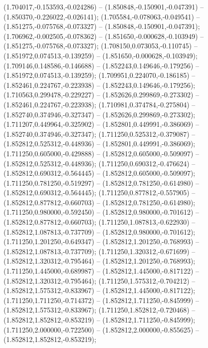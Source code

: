  (1.704017,-0.153593,-0.024286) -- (1.850848,-0.150901,-0.047391) -- (1.850370,-0.226022,-0.026141);
 (1.705584,-0.078063,-0.049541) -- (1.851275,-0.075768,-0.073327) -- (1.850848,-0.150901,-0.047391);
 (1.706962,-0.002505,-0.078362) -- (1.851650,-0.000628,-0.103949) -- (1.851275,-0.075768,-0.073327);
 (1.708150,0.073053,-0.110745) -- (1.851972,0.074513,-0.139259) -- (1.851650,-0.000628,-0.103949);
 (1.709146,0.148586,-0.146688) -- (1.852243,0.149646,-0.179256) -- (1.851972,0.074513,-0.139259);
 (1.709951,0.224070,-0.186185) -- (1.852461,0.224767,-0.223938) -- (1.852243,0.149646,-0.179256);
 (1.710563,0.299478,-0.229227) -- (1.852626,0.299869,-0.273302) -- (1.852461,0.224767,-0.223938);
 (1.710981,0.374784,-0.275804) -- (1.852740,0.374946,-0.327347) -- (1.852626,0.299869,-0.273302);
 (1.711207,0.449964,-0.325902) -- (1.852801,0.449991,-0.386069) -- (1.852740,0.374946,-0.327347);
 (1.711250,0.525312,-0.379087) -- (1.852812,0.525312,-0.448936) -- (1.852801,0.449991,-0.386069);
 (1.711250,0.605000,-0.429888) -- (1.852812,0.605000,-0.509097) -- (1.852812,0.525312,-0.448936);
 (1.711250,0.690312,-0.476624) -- (1.852812,0.690312,-0.564445) -- (1.852812,0.605000,-0.509097);
 (1.711250,0.781250,-0.519297) -- (1.852812,0.781250,-0.614980) -- (1.852812,0.690312,-0.564445);
 (1.711250,0.877812,-0.557905) -- (1.852812,0.877812,-0.660703) -- (1.852812,0.781250,-0.614980);
 (1.711250,0.980000,-0.592450) -- (1.852812,0.980000,-0.701612) -- (1.852812,0.877812,-0.660703);
 (1.711250,1.087813,-0.622930) -- (1.852812,1.087813,-0.737709) -- (1.852812,0.980000,-0.701612);
 (1.711250,1.201250,-0.649347) -- (1.852812,1.201250,-0.768993) -- (1.852812,1.087813,-0.737709);
 (1.711250,1.320312,-0.671699) -- (1.852812,1.320312,-0.795464) -- (1.852812,1.201250,-0.768993);
 (1.711250,1.445000,-0.689987) -- (1.852812,1.445000,-0.817122) -- (1.852812,1.320312,-0.795464);
 (1.711250,1.575312,-0.704212) -- (1.852812,1.575312,-0.833967) -- (1.852812,1.445000,-0.817122);
 (1.711250,1.711250,-0.714372) -- (1.852812,1.711250,-0.845999) -- (1.852812,1.575312,-0.833967);
 (1.711250,1.852812,-0.720468) -- (1.852812,1.852812,-0.853219) -- (1.852812,1.711250,-0.845999);
 (1.711250,2.000000,-0.722500) -- (1.852812,2.000000,-0.855625) -- (1.852812,1.852812,-0.853219);
